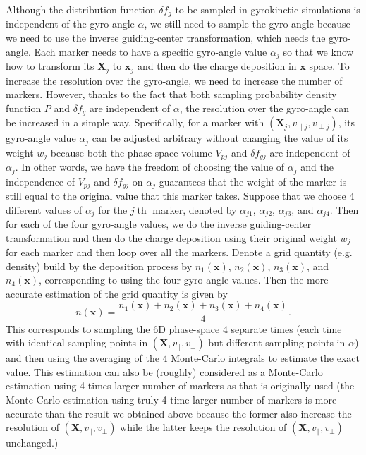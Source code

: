 \documentclass{article}
\newcommand{\tmop}[1]{\ensuremath{\operatorname{#1}}}
\begin{document}
Although the distribution function $\delta f_g$ to be sampled in gyrokinetic
simulations is independent of the gyro-angle $\alpha$, we still need to sample
the gyro-angle because we need to use the inverse guiding-center
transformation, which needs the gyro-angle. Each marker needs to have a
specific gyro-angle value $\alpha_j$ so that we know how to transform its
$\mathbf{X}_j$ to $\mathbf{x}_j$ and then do the charge deposition in
$\mathbf{x}$ space. To increase the resolution over the gyro-angle, we need to
increase the number of markers. However, thanks to the fact that both sampling
probability density function $P$ and $\delta f_g$ are independent of $\alpha$,
the resolution over the gyro-angle can be increased in a simple way.
Specifically, for a marker with $(\mathbf{X}_j, v_{\parallel j}, v_{\perp
j})$, its gyro-angle value $\alpha_j$ can be adjusted arbitrary without
changing the value of its weight $w_j$ because both the phase-space volume
$V_{p j}$ and $\delta f_{g j}$ are independent of $\alpha_j$. In other words,
we have the freedom of choosing the value of $\alpha_j$ and the independence
of $V_{p j}$ and $\delta f_{g j}$ on $\alpha_j$ guarantees that the weight of
the marker is still equal to the original value that this marker takes.
Suppose that we choose $4$ different values of $\alpha_j$ for the $j
\tmop{th}$ marker, denoted by $\alpha_{j 1}$, $\alpha_{j 2}$, $\alpha_{j 3}$,
and $\alpha_{j 4}$. Then for each of the four gyro-angle values, we do the
inverse guiding-center transformation and then do the charge deposition using
their original weight $w_j$ for each marker and then loop over all the
markers. Denote a grid quantity (e.g. density) build by the deposition process
by $n_1 (\mathbf{x})$, $n_2 (\mathbf{x})$, $n_3 (\mathbf{x})$, and $n_4
(\mathbf{x})$, corresponding to using the four gyro-angle values. Then the
more accurate estimation of the grid quantity is given by
\begin{equation}
  n (\mathbf{x}) = \frac{n_1 (\mathbf{x}) + n_2 (\mathbf{x}) + n_3
  (\mathbf{x}) + n_4 (\mathbf{x})}{4} .
\end{equation}
This corresponds to sampling the 6D phase-space 4 separate times (each time
with identical sampling points in $(\mathbf{X}, v_{\parallel}, v_{\perp})$ but
different sampling points in $\alpha$) and then using the averaging of the 4
Monte-Carlo integrals to estimate the exact value. This estimation can also be
(roughly) considered as a Monte-Carlo estimation using 4 times larger number
of markers as that is originally used (the Monte-Carlo estimation using truly
4 time larger number of markers is more accurate than the result we obtained
above because the former also increase the resolution of $(\mathbf{X},
v_{\parallel}, v_{\perp})$ while the latter keeps the resolution of
$(\mathbf{X}, v_{\parallel}, v_{\perp})$ unchanged.)
\end{document}
